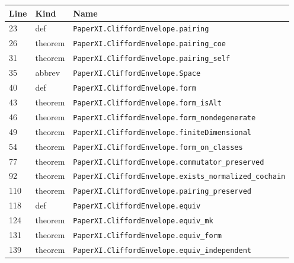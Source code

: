 \documentclass[10pt,oneside]{book}
\begin{document}
\begin{longtable}{@{}p{}p{}p{}@{}}\toprule Line&Kind&Name\\\midrule\endhead

23&def&\nolinkurl{PaperXI.CliffordEnvelope.pairing}\\

26&theorem&\nolinkurl{PaperXI.CliffordEnvelope.pairing_coe}\\

31&theorem&\nolinkurl{PaperXI.CliffordEnvelope.pairing_self}\\

35&abbrev&\nolinkurl{PaperXI.CliffordEnvelope.Space}\\

40&def&\nolinkurl{PaperXI.CliffordEnvelope.form}\\

43&theorem&\nolinkurl{PaperXI.CliffordEnvelope.form_isAlt}\\

46&theorem&\nolinkurl{PaperXI.CliffordEnvelope.form_nondegenerate}\\

49&theorem&\nolinkurl{PaperXI.CliffordEnvelope.finiteDimensional}\\

54&theorem&\nolinkurl{PaperXI.CliffordEnvelope.form_on_classes}\\

77&theorem&\nolinkurl{PaperXI.CliffordEnvelope.commutator_preserved}\\

92&theorem&\nolinkurl{PaperXI.CliffordEnvelope.exists_normalized_cochain}\\

110&theorem&\nolinkurl{PaperXI.CliffordEnvelope.pairing_preserved}\\

118&def&\nolinkurl{PaperXI.CliffordEnvelope.equiv}\\

124&theorem&\nolinkurl{PaperXI.CliffordEnvelope.equiv_mk}\\

131&theorem&\nolinkurl{PaperXI.CliffordEnvelope.equiv_form}\\

139&theorem&\nolinkurl{PaperXI.CliffordEnvelope.equiv_independent}\\

\bottomrule\end{longtable}
\end{document}
